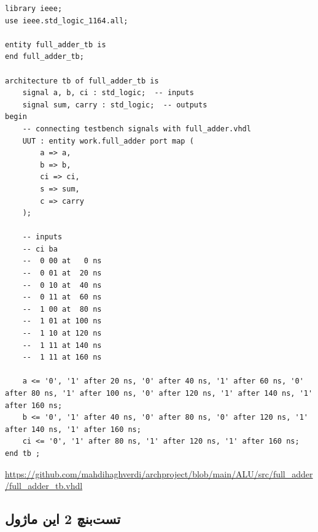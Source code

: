 \documentclass[dvipsnames, svgnames, x11names, a4paper, 11pt, oneside]{book}
\begin{document}
						\begin{latin}
							\begin{lstlisting}
library ieee;
use ieee.std_logic_1164.all;

entity full_adder_tb is
end full_adder_tb;

architecture tb of full_adder_tb is
	signal a, b, ci : std_logic;  -- inputs
	signal sum, carry : std_logic;  -- outputs
begin
	-- connecting testbench signals with full_adder.vhdl
	UUT : entity work.full_adder port map (
		a => a,
		b => b,
		ci => ci,
		s => sum,
		c => carry
	);
	
	-- inputs
	-- ci ba
	--  0 00 at   0 ns
	--  0 01 at  20 ns
	--  0 10 at  40 ns
	--  0 11 at  60 ns
	--  1 00 at  80 ns
	--  1 01 at 100 ns
	--  1 10 at 120 ns
	--  1 11 at 140 ns
	--  1 11 at 160 ns
	
	a <= '0', '1' after 20 ns, '0' after 40 ns, '1' after 60 ns, '0' after 80 ns, '1' after 100 ns, '0' after 120 ns, '1' after 140 ns, '1' after 160 ns;
	b <= '0', '1' after 40 ns, '0' after 80 ns, '0' after 120 ns, '1' after 140 ns, '1' after 160 ns;
	ci <= '0', '1' after 80 ns, '1' after 120 ns, '1' after 160 ns;
end tb ;
							\end{lstlisting}
							\url{https://github.com/mahdihaghverdi/archproject/blob/main/ALU/src/full_adder/full_adder_tb.vhdl}
						\end{latin}	
					\subsection{تست‌‌بنچ 2 این ماژول}
					
\end{document}
